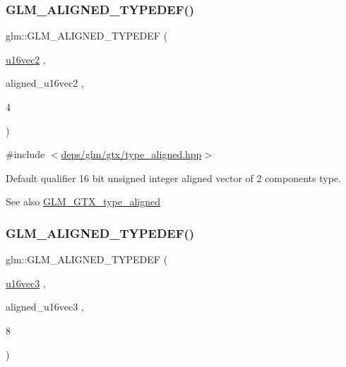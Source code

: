 \subsubsection{\texorpdfstring{G\+L\+M\+\_\+\+A\+L\+I\+G\+N\+E\+D\+\_\+\+T\+Y\+P\+E\+D\+E\+F()}{GLM\_ALIGNED\_TYPEDEF()}\hspace{0.1cm}{\footnotesize\ttfamily [126/209]}}
{\footnotesize\ttfamily glm\+::\+G\+L\+M\+\_\+\+A\+L\+I\+G\+N\+E\+D\+\_\+\+T\+Y\+P\+E\+D\+EF (\begin{DoxyParamCaption}\item[{\hyperlink{group__gtc__type__precision_ga50bd2ceeb100a187e7c46f135269a0ec}{u16vec2}}]{,  }\item[{aligned\+\_\+u16vec2}]{,  }\item[{4}]{ }\end{DoxyParamCaption})}



{\ttfamily \#include $<$\hyperlink{gtx_2type__aligned_8hpp}{deps/glm/gtx/type\+\_\+aligned.\+hpp}$>$}

Default qualifier 16 bit unsigned integer aligned vector of 2 components type. \begin{DoxySeeAlso}{See also}
\hyperlink{group__gtx__type__aligned}{G\+L\+M\+\_\+\+G\+T\+X\+\_\+type\+\_\+aligned} 
\end{DoxySeeAlso}
\mbox{\label{group__gtx__type__aligned_ga09540dbca093793a36a8997e0d4bee77}} 
\subsubsection{\texorpdfstring{G\+L\+M\+\_\+\+A\+L\+I\+G\+N\+E\+D\+\_\+\+T\+Y\+P\+E\+D\+E\+F()}{GLM\_ALIGNED\_TYPEDEF()}\hspace{0.1cm}{\footnotesize\ttfamily [127/209]}}
{\footnotesize\ttfamily glm\+::\+G\+L\+M\+\_\+\+A\+L\+I\+G\+N\+E\+D\+\_\+\+T\+Y\+P\+E\+D\+EF (\begin{DoxyParamCaption}\item[{\hyperlink{group__gtc__type__precision_gad60f14d1abd39b480cbe5c5cf848071a}{u16vec3}}]{,  }\item[{aligned\+\_\+u16vec3}]{,  }\item[{8}]{ }\end{DoxyParamCaption})}



